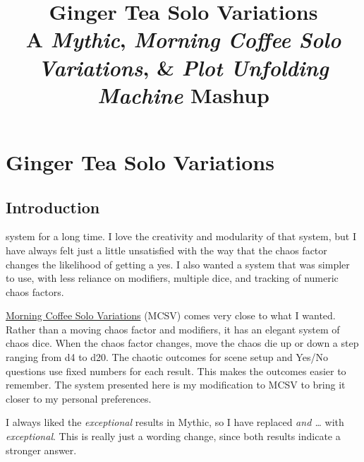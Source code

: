 

\title{
\Huge{Ginger Tea Solo Variations}
\\ \small{A \emph{Mythic}, \emph{Morning Coffee Solo Variations}, \& \emph{Plot Unfolding Machine} Mashup}
}


\onecolumn
\frontmatter{}

\mainmatter{}

\chapter*{Ginger Tea Solo Variations \version}

\section{Introduction}
system for a long time. I love the creativity and modularity of that system,
but I have always felt just a little unsatisfied with the way that the chaos
factor changes the likelihood of getting a yes. I also wanted a system
that was simpler to use, with less reliance on modifiers, multiple dice, and
tracking of numeric chaos factors.

\href{https://aleaiactandaest.blogspot.com/p/downloads.html}{Morning Coffee Solo
Variations} (MCSV) comes very close to what I wanted. Rather than a moving chaos
factor and modifiers, it has an elegant system of chaos dice. When the chaos
factor changes, move the chaos die up or down a step ranging from d4 to d20. The
chaotic outcomes for scene setup and Yes/No questions use fixed numbers for each
result. This makes the outcomes easier to remember. The system presented here is
my modification to MCSV to bring it closer to my personal preferences.

I always liked the \emph{exceptional} results in Mythic, so I have replaced
\emph{and \ldots} with \emph{exceptional}. This is really just a wording change,
since both results indicate a stronger answer.

